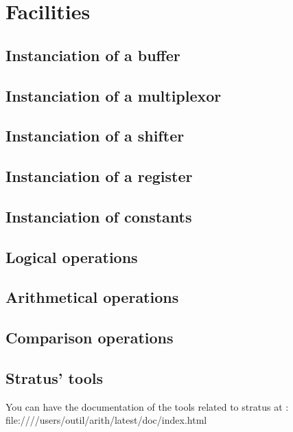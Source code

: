 \documentclass[12pt]{article}
\begin{document}
\newpage
\section{Facilities}
\label{secfacilities}

    \subsection{Instanciation of a buffer}
    \label{secbuff}
    
    \subsection{Instanciation of a multiplexor}
    \label{secmux}
    
    \subsection{Instanciation of a shifter}
    \label{secshift}
    
    \subsection{Instanciation of a register}
    \label{secreg}
        
    \subsection{Instanciation of constants}
    \label{secconstant}
        
    \subsection{Logical operations}
    \label{secbool}
    
    \subsection{Arithmetical operations}
    \label{secarithmetic}
    
    \subsection{Comparison operations}
    \label{seccomp}
    

\begin{htmlonly}
\section{Stratus' tools}

You can have the documentation of the tools related to stratus at :\\
file:////users/outil/arith/latest/doc/index.html
\end{htmlonly}
    
\end{document}
